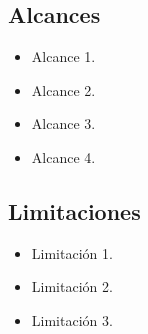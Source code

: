\subsection{Alcances}

\begin{itemize}
	\item Alcance 1.
	\item Alcance 2.
	\item Alcance 3.
	\item Alcance 4.
\end{itemize}

\subsection{Limitaciones}

\begin{itemize}
	\item Limitación 1.
	\item Limitación 2.
	\item Limitación 3.
\end{itemize}
